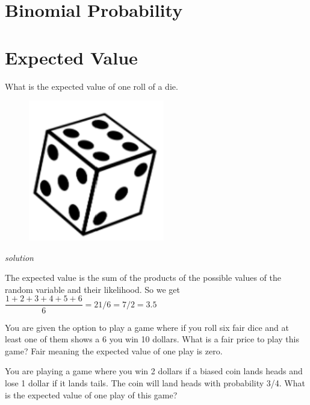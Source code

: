 \documentclass{amsbook}
\begin{document}
\section{Binomial Probability}

\section{Expected Value}

\begin{Exercise}[title={Dice}, difficulty=1, label=ev1]
    What is the expected value of one roll of a die.
    \begin{figure}[H]
        \includegraphics[width=.2\linewidth]{l.png}
    \end{figure}

    \hfill \emph{solution} 
\end{Exercise}

\begin{Answer}[ref={ev1}]
    The expected value is the sum of the products of the possible values of the random variable and their likelihood. So we get $\dfrac{1+2+3+4+5+6}{6}=21/6=7/2=3.5$ 
\end{Answer}

\begin{Exercise}[title={Newton and Pepys gamble}, difficulty =2, label = ev2]
    You are given the option to play a game where if you roll six fair dice and at least one of them shows a 6 you win 10 dollars. What is a fair price to play this game? Fair meaning the expected value of one play is zero.
\end{Exercise}

\begin{Answer}[ref={ev2}]
    
\end{Answer}

\begin{Exercise}[title={A Game with a Biased Coin}, difficulty=1, label=ev3]
    You are playing a game where you win 2 dollars if a biased coin lands heads and lose 1 dollar if it lands tails. The coin will land heads with probability 3/4. What is the expected value of one play of this game?
    
\end{Exercise}
\end{document}
